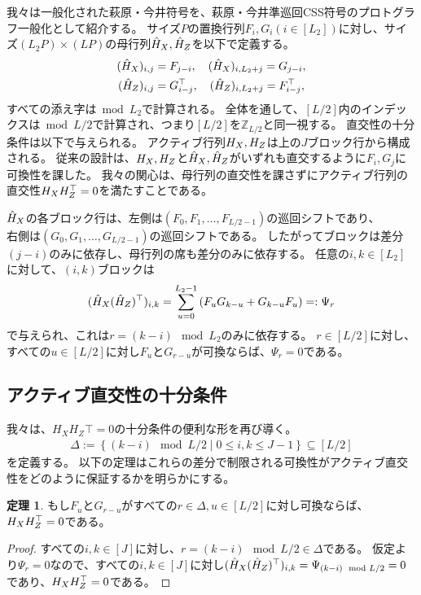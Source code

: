 \documentclass[a4paper,11pt,dvipdfmx]{jsarticle}
\theoremstyle{definition}
\newtheorem{theorem}[definition]{定理}
\begin{document}
我々は一般化された萩原・今井符号を、萩原・今井準巡回CSS符号のプロトグラフ一般化として紹介する。
サイズ$P$の置換行列$F_i,G_i(i\in[L_2])$に対し、サイズ$(L_2P)\times (LP)$の母行列$\hat{H}_X,\hat{H}_Z$を以下で定義する。
\begin{align}
  (\hat{H}_X)_{i,j} &= F_{j-i},\quad (\hat{H}_X)_{i,L_2+j}=G_{j-i},\\
  (\hat{H}_Z)_{i,j} &= G_{i-j}^\top,\quad (\hat{H}_Z)_{i,L_2+j}=F_{i-j}^\top,
\end{align}
すべての添え字は$\bmod{L_2}$で計算される。
全体を通して、$[L/2]$内のインデックスは$\bmod{L/2}$で計算され、つまり$[L/2]$を$\mathbb{Z}_{L/2}$と同一視する。
直交性の十分条件は以下で与えられる。
アクティブ行列$H_X,H_Z$は上の$J$ブロック行から構成される。
従来の設計は、$H_X,H_Z$と$\hat{H}_X,\hat{H}_Z$がいずれも直交するように$F_i,G_j$に可換性を課した。
我々の関心は、母行列の直交性を課さずにアクティブ行列の直交性$H_XH_Z^\top = 0$を満たすことである。

$\hat{H}_X$の各ブロック行は、左側は$(F_0,F_1,\dots,F_{L/2-1})$の巡回シフトであり、\\右側は$(G_0,G_1,\dots,G_{L/2-1})$の巡回シフトである。
したがってブロックは差分$(j-i)$のみに依存し、母行列の席も差分のみに依存する。
任意の$i,k\in[L_2]$に対して、$(i,k)$ブロックは
\begin{align}
  (\hat{H}_X(\hat{H}_Z)^\top)_{i,k} = \sum_{u=0}^{L_2-1}\left(F_uG_{k-u} + G_{k-u}F_u\right) =: \Psi_r
\end{align}
で与えられ、これは$r=(k-i)\mod L_2$のみに依存する。
$r\in[L/2]$に対し、すべての$u\in[L/2]$に対し$F_u$と$G_{r-u}$が可換ならば、$\Psi_r=0$である。

\subsection{アクティブ直交性の十分条件}
我々は、$H_XH_Z\top=0$の十分条件の便利な形を再び導く。
\begin{align}
  \Delta := \left\{(k-i)\mod L/2\mid 0\leq i,k\leq J-1\right\}\subseteq[L/2]
\end{align}
を定義する。
以下の定理はこれらの差分で制限される可換性がアクティブ直交性をどのように保証するかを明らかにする。
\begin{theorem}
  もし$F_u$と$G_{r-u}$がすべての$r\in\Delta,u\in[L/2]$に対し可換ならば、$H_XH_Z^\top=0$である。
\end{theorem}
\begin{proof}
  すべての$i,k\in[J]$に対し、$r=(k-i)\mod L/2\in \Delta$である。
  仮定より$\Psi_r=0$なので、すべての$i,k\in[J]$に対し$(\hat{H}_X(\hat{H}_Z)^\top)_{i,k}=\Psi_{(k-i)\mod L/2}=0$であり、$H_XH_Z^\top=0$である。
\end{proof}
\end{document}
